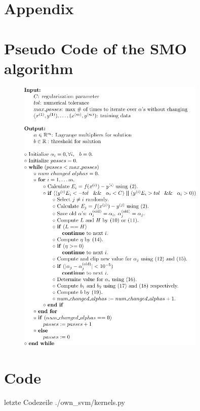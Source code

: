 \section*{Appendix}
\appendix
\section{Pseudo Code of the SMO algorithm}
\begin{figure}[!h]
  \centering
    \includegraphics[width=0.8\textwidth]{media_saved/pseudo_code}
  \label{fig:gull}
\end{figure}

\section{Code}
 letzte Codezeile
{./own_svm/kernels.py}

\printbibliography %
        
